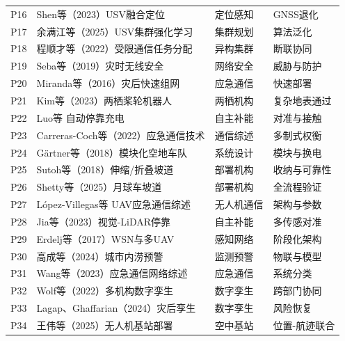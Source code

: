 \documentclass[UTF8,a4paper,zihao=-4]{ctexart}
\begin{document}
\begin{longtable}{p{12mm}p{63mm}p{31mm}p{45mm}}
P16 & Shen等（2023）USV融合定位 & 定位感知 & GNSS退化\\

P17 & 余满江等（2025）USV集群强化学习 & 集群规划 & 算法泛化\\

P18 & 程顺才等（2022）受限通信任务分配 & 异构集群 & 断联协同\\

P19 & Seba等（2019）灾时无线安全 & 网络安全 & 威胁与防护\\

P20 & Miranda等（2016）灾后快速组网 & 应急通信 & 快速部署\\

P21 & Kim等（2023）两栖桨轮机器人 & 两栖机构 & 复杂地表通过\\

P22 & Luo等 自动停靠充电 & 自主补能 & 对准与接触\\

P23 & Carreras-Coch等（2022）应急通信技术 & 通信综述 & 多制式权衡\\

P24 & Gärtner等（2018）模块化空地车队 & 系统设计 & 模块与换电\\

P25 & Sutoh等（2018）伸缩/折叠坡道 & 部署机构 & 收纳与可靠性\\

P26 & Shetty等（2025）月球车坡道 & 部署机构 & 全流程验证\\

P27 & López-Villegas等 UAV应急通信综述 & 无人机通信 & 架构与参数\\

P28 & Jia等（2023）视觉-LiDAR停靠 & 自主补能 & 多传感对准\\

P29 & Erdelj等（2017）WSN与多UAV & 感知网络 & 阶段化架构\\

P30 & 高成等（2024）城市内涝预警 & 监测预警 & 物联与模型\\

P31 & Wang等（2023）应急通信网络综述 & 应急通信 & 系统分类\\

P32 & Wolf等（2022）多机构数字孪生 & 数字孪生 & 跨部门协同\\

P33 & Lagap、Ghaffarian（2024）灾后孪生 & 数字孪生 & 风险恢复\\

P34 & 王伟等（2025）无人机基站部署 & 空中基站 & 位置-航迹联合\\


\end{longtable}
\end{document}
